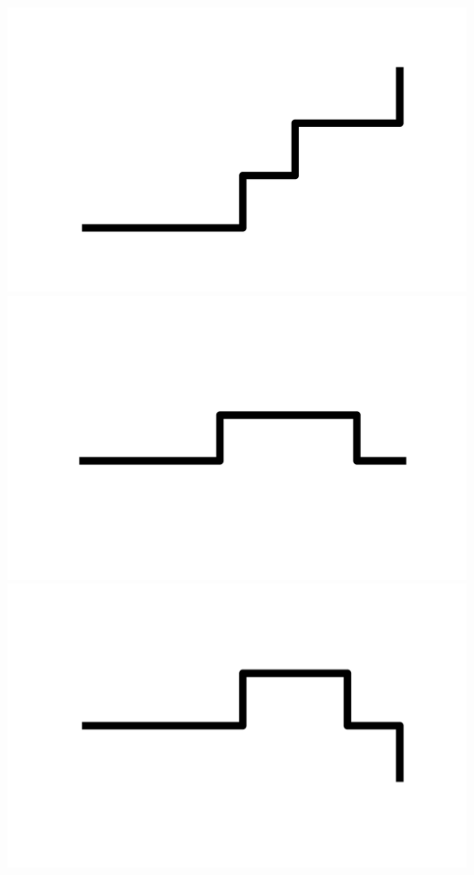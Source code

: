 \documentclass[]{report}
\begin{document}
\includegraphics[scale=.1]{pictures/17/state_cluster_shapes_10.pdf} 
\includegraphics[scale=.1]{pictures/17/state_cluster_shapes_11.pdf} 
\includegraphics[scale=.1]{pictures/17/state_cluster_shapes_12.pdf} 
\end{document}
